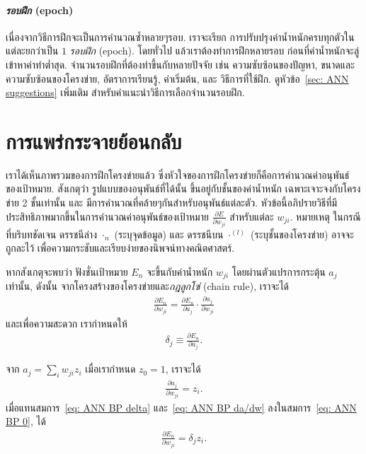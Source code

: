 \paragraph{\textit{รอบฝึก} (epoch)} 
เนื่องจากวิธีการฝึกจะเป็นการคำนวณซ้ำหลายๆรอบ.
เราจะเรียก การปรับปรุงค่าน้ำหนักครบทุกตัวในแต่ละยกว่าเป็น $1$ \textit{รอบฝึก} (epoch).
โดยทั่วไป แล้วเราต้องทำการฝึกหลายรอบ ก่อนที่ค่าน้ำหนักจะลู่เข้าหาค่าทำต่ำสุด.
จำนวนรอบฝึกที่ต้องทำขึ้นกับหลายปัจจัย เช่น ความซับซ้อนของปัญหา, ขนาดและความซับซ้อนของโครงข่าย, อัตราการเรียนรู้, ค่าเริ่มต้น, และ วิธีการที่ใช้ฝึก.
ดูหัวข้อ~\ref{sec: ANN suggestions} เพิ่มเติม สำหรับคำแนะนำวิธีการเลือกจำนวนรอบฝึก.



\section{การแพร่กระจายย้อนกลับ}
\label{sec: ANN backpropagation}

เราได้เห็นภาพรวมของการฝึกโครงข่ายแล้ว %
ซึ่งหัวใจของการฝึกโครงข่ายก็คือการคำนวณค่าอนุพันธ์ของเป้าหมาย.
สังเกตุว่า รูปแบบของอนุพันธ์ที่ได้นั้น
ขึ้นอยู่กับชั้นของค่าน้ำหนัก
เฉพาะเจาะจงกับโครงข่าย 2 ชั้นเท่านั้น
และ มีการคำนวณที่คล้ายๆกันสำหรับอนุพันธ์แต่ละตัว.
หัวข้อนี้อภิปรายวิธีที่มีประสิทธิภาพมากขึ้นในการคำนวณค่าอนุพันธ์ของเป้าหมาย 
$\frac{\partial E}{\partial w_{ji}}$ สำหรับแต่ละ $w_{ji}$.
หมายเหตุ ในกรณีที่บริบทชัดเจน 
ดรรชนีล่าง $\cdot_n$ (ระบุจุดข้อมูล)
และ ดรรชนีบน $\cdot^{(l)}$ (ระบุชั้นของโครงข่าย) อาจจะถูกละไว้ เพื่อความกระชับและเรียบง่ายของนิพจน์ทางคณิตศาสตร์. 

หากสังเกตุจะพบว่า ฟังชั่นเป้าหมาย $E_n$ จะขึ้นกับค่าน้ำหนัก $w_{ji}$ โดยผ่านตัวแปรการกระตุ้น $a_{j}$ เท่านั้น, ดังนั้น จากโครงสร้างของโครงข่ายและ\textit{กฎลูกโซ่} (chain rule), เราจะได้ 
\begin{eqnarray}
  \frac{\partial E_n}{\partial w_{ji}} = \frac{\partial E_n}{\partial a_j} \cdot \frac{\partial a_j}{\partial w_{ji}}
\label{eq: ANN BP 0}  
\end{eqnarray}
และเพื่อความสะดวก เรากำหนดให้
\begin{eqnarray}
   \delta_j \equiv \frac{\partial E_n}{\partial a_j}.
\label{eq: ANN BP delta}   
\end{eqnarray}

จาก $a_j = \sum_i w_{ji} z_i$ เมื่อเรากำหนด $z_0 = 1$, เราจะได้
\begin{eqnarray}
   \frac{\partial a_j}{\partial w_{ji}} = z_i.
\label{eq: ANN BP da/dw}      
\end{eqnarray}
เมื่อแทนสมการ~\ref{eq: ANN BP delta} และ~\ref{eq: ANN BP da/dw} ลงในสมการ~\ref{eq: ANN BP 0}, ได้
\begin{eqnarray}
   \frac{\partial E_n}{\partial w_{ji}} = \delta_j z_i.
\label{eq: ANN BP dE/dw}   
\end{eqnarray}

